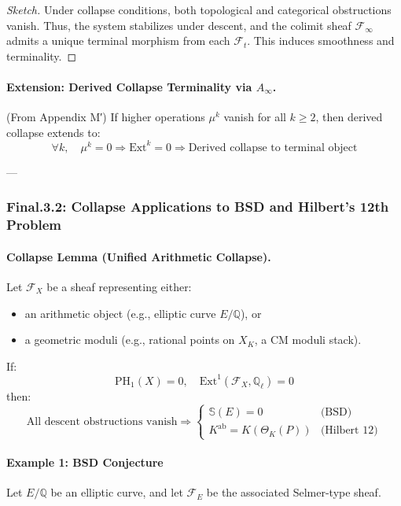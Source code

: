 \documentclass[11pt]{article}
\newcommand{\Sha}{\mathbb{S}}
\begin{document}
\begin{axiom}
\begin{axiom}
{{\begin{proof}[Sketch]
Under collapse conditions, both topological and categorical obstructions vanish.  
Thus, the system stabilizes under descent, and the colimit sheaf \( \mathcal{F}_\infty \) admits a unique terminal morphism from each \( \mathcal{F}_t \).  
This induces smoothness and terminality.
\end{proof}

\paragraph{Extension: Derived Collapse Terminality via \(A_\infty\).}
(From Appendix M′) If higher operations \(\mu^k\) vanish for all \(k \geq 2\), then derived collapse extends to:
\[
\forall k, \quad \mu^k = 0 \Rightarrow \mathrm{Ext}^k = 0
\Rightarrow \text{Derived collapse to terminal object}
\]

---

\subsubsection*{Final.3.2: Collapse Applications to BSD and Hilbert’s 12th Problem}

\paragraph{Collapse Lemma (Unified Arithmetic Collapse).}
Let \( \mathcal{F}_X \) be a sheaf representing either:
\begin{itemize}
  \item an arithmetic object (e.g., elliptic curve \( E/\mathbb{Q} \)), or
  \item a geometric moduli (e.g., rational points on \( X_K \), a CM moduli stack).
\end{itemize}

If:
\[
\mathrm{PH}_1(X) = 0, \quad \mathrm{Ext}^1(\mathcal{F}_X, \mathbb{Q}_\ell) = 0
\]
then:
\[
\text{All descent obstructions vanish} \Rightarrow 
\begin{cases}
\Sha(E) = 0 & \text{(BSD)} \\
K^{\mathrm{ab}} = K(\Theta_K(P)) & \text{(Hilbert 12)}
\end{cases}
\]

\paragraph{Example 1: BSD Conjecture}
Let \( E/\mathbb{Q} \) be an elliptic curve, and let \( \mathcal{F}_E \) be the associated Selmer-type sheaf.

}}
\end{axiom}
\end{axiom}
\end{document}
